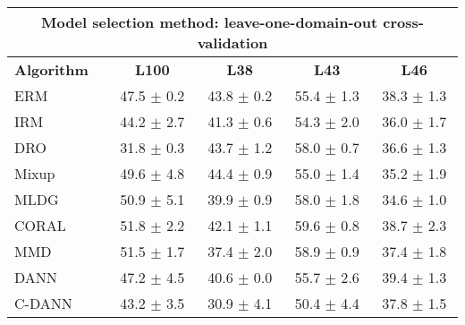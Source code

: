 \documentclass{article}
\begin{document}
\begin{center}
\begin{tabular}{lcccc}
\toprule
\multicolumn{5}{c}{\textbf{Model selection method: leave-one-domain-out cross-validation}} \\
\midrule
\textbf{Algorithm}    & \textbf{L100}             & \textbf{L38}              & \textbf{L43}              & \textbf{L46}              \\
\midrule
ERM                       & 47.5 $\pm$ 0.2            & 43.8 $\pm$ 0.2            & 55.4 $\pm$ 1.3            & 38.3 $\pm$ 1.3            \\
IRM                       & 44.2 $\pm$ 2.7            & 41.3 $\pm$ 0.6            & 54.3 $\pm$ 2.0            & 36.0 $\pm$ 1.7            \\
DRO                 & 31.8 $\pm$ 0.3            & 43.7 $\pm$ 1.2            & 58.0 $\pm$ 0.7            & 36.6 $\pm$ 1.3            \\
Mixup                     & 49.6 $\pm$ 4.8            & 44.4 $\pm$ 0.9            & 55.0 $\pm$ 1.4            & 35.2 $\pm$ 1.9            \\
MLDG                      & 50.9 $\pm$ 5.1            & 39.9 $\pm$ 0.9            & 58.0 $\pm$ 1.8            & 34.6 $\pm$ 1.0            \\
CORAL                     & 51.8 $\pm$ 2.2            & 42.1 $\pm$ 1.1            & 59.6 $\pm$ 0.8            & 38.7 $\pm$ 2.3            \\
MMD                       & 51.5 $\pm$ 1.7            & 37.4 $\pm$ 2.0            & 58.9 $\pm$ 0.9            & 37.4 $\pm$ 1.8            \\
DANN                       & 47.2 $\pm$ 4.5            & 40.6 $\pm$ 0.0            & 55.7 $\pm$ 2.6            & 39.4 $\pm$ 1.3            \\
C-DANN                   & 43.2 $\pm$ 3.5            & 30.9 $\pm$ 4.1            & 50.4 $\pm$ 4.4            & 37.8 $\pm$ 1.5            \\
\bottomrule
\end{tabular}
\end{center}
\end{document}
